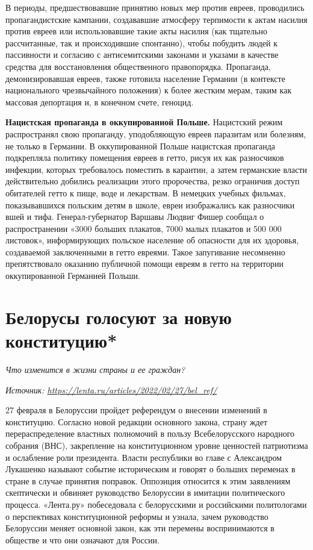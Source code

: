 В периоды, предшествовавшие принятию новых мер против евреев, проводились пропагандистские кампании, создававшие атмосферу терпимости к актам насилия против евреев или использовавшие такие акты насилия (как тщательно рассчитанные, так и происходившие спонтанно), чтобы побудить людей к пассивности и согласию с антисемитскими законами и указами в качестве средства для восстановления общественного правопорядка. Пропаганда, демонизировавшая евреев, также готовила население Германии (в контексте национального чрезвычайного положения) к более жестким мерам, таким как массовая депортация и, в конечном счете, геноцид.

\textbf{Нацистская пропаганда в оккупированной Польше.} Нацистский режим распространял свою пропаганду, уподобляющую евреев паразитам или болезням, не только в Германии. В оккупированной Польше нацистская пропаганда подкрепляла политику помещения евреев в гетто, рисуя их как разносчиков инфекции, которых требовалось поместить в карантин, а затем германские власти действительно добились реализации этого пророчества, резко ограничив доступ обитателей гетто к пище, воде и лекарствам. В немецких учебных фильмах, показывавшихся польским детям в школе, евреи изображались как разносчики вшей и тифа. Генерал-губернатор Варшавы Людвиг Фишер сообщал о распространении «3000 больших плакатов, 7000 малых плакатов и 500 000 листовок», информирующих польское население об опасности для их здоровья, создаваемой заключенными в гетто евреями. Такое запугивание несомненно препятствовало оказанию публичной помощи евреям в гетто на территории оккупированной Германией Польши.


\clearpage


\section{Белорусы голосуют за новую конституцию*}

\textit{Что изменится в жизни страны и ее граждан?}

\textit{Источник: \url{https://lenta.ru/articles/2022/02/27/bel_ref/}}

27 февраля в Белоруссии пройдет референдум о внесении изменений в конституцию. Согласно новой редакции основного закона, страну ждет перераспределение властных полномочий в пользу Всебелорусского народного собрания (ВНС), закрепление на конституционном уровне ценностей патриотизма и ослабление роли президента. Власти республики во главе с Александром Лукашенко называют событие историческим и говорят о больших переменах в стране в случае принятия поправок. Оппозиция относится к этим заявлениям скептически и обвиняет руководство Белоруссии в имитации политического процесса. «Лента.ру» побеседовала с белорусскими и российскими политологами о перспективах конституционной реформы и узнала, зачем руководство Белоруссии меняет основной закон, как эти перемены воспринимаются в обществе и что они означают для России.


